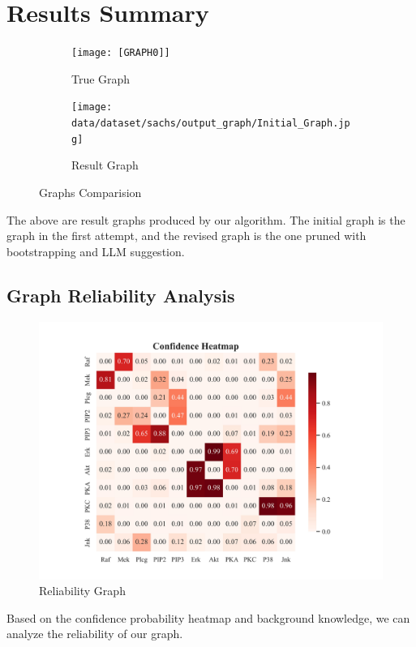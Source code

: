 \documentclass{article}
\begin{document}
\section{Results Summary}

\begin{figure}[H]
    \centering

    \begin{subfigure}{0.4\textwidth}
        \centering
        \texttt{[image: [GRAPH0]]}
        \caption{True Graph}
        \label{fig:sub1}
    \end{subfigure}
    \hspace{0.01\textwidth}  %

    \begin{subfigure}{0.4\textwidth}
        \centering
        \texttt{[image: data/dataset/sachs/output\_graph/Initial\_Graph.jpg]}
        \caption{Result Graph}
        \label{fig:sub2}
    \end{subfigure}

    \caption{Graphs Comparision}
    \label{fig:main}
\end{figure}

The above are result graphs produced by our algorithm.
The initial graph is the graph in the first attempt, and the revised graph is the one pruned with bootstrapping and LLM suggestion.

\subsection{Graph Reliability Analysis}

\begin{figure}[H]
        \centering
        \includegraphics[width=0.6\linewidth]{data/dataset/sachs/output_graph/confidence_heatmap.jpg}
        \caption{Reliability Graph}
        \label{fig:sub3}
\end{figure}

Based on the confidence probability heatmap and background knowledge, we can analyze the reliability of our graph.
\end{document}
